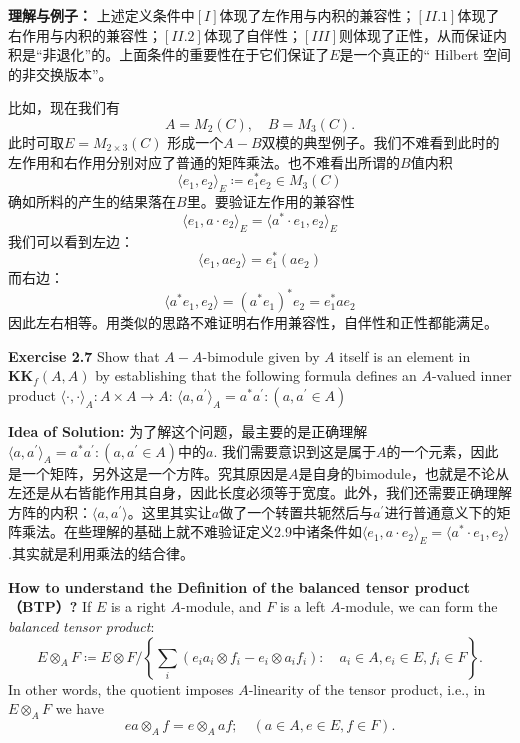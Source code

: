\textbf{理解与例子：} 上述定义条件中$[I]$体现了左作用与内积的兼容性；$[II.1]$体现了右作用与内积的兼容性；$[II.2]$体现了自伴性；$[III]$则体现了正性，从而保证内积是“非退化”的。上面条件的重要性在于它们保证了$E$是一个真正的“ Hilbert 空间的非交换版本”。

比如，现在我们有\[A=M_2(C),\quad B=M_3(C).\] 此时可取$E=M_{2\times 3}(C)$ 形成一个$A-B$双模的典型例子。我们不难看到此时的左作用和右作用分别对应了普通的矩阵乘法。也不难看出所谓的$B$值内积\[\langle e_1,e_2\rangle_E\coloneqq e_1^*e_2\in M_3(C)\]确如所料的产生的结果落在$B$里。要验证左作用的兼容性\[\langle e_1,a\cdot e_2\rangle_E=\langle a^*\cdot e_1, e_2\rangle_E\]我们可以看到左边：\[\langle e_1,ae_2\rangle=e_1^*(ae_2)\]而右边：\[\langle a^*e_1,e_2\rangle=(a^*e_1)^*e_2=e^*_1ae_2\]因此左右相等。用类似的思路不难证明右作用兼容性，自伴性和正性都能满足。

\textbf{Exercise 2.7} Show that $A - A$-bimodule given by $A$ itself is an element in $\textbf{KK}_f(A,A)$ by establishing that the following formula defines an $A$-valued inner product $\langle\cdot,\cdot\rangle_A:A\times A\rightarrow A$: $\langle a, a^{\prime}\rangle_A=a^*a^{\prime}: (a,a^{\prime}\in A)$

\textbf{Idea of Solution:} 为了解这个问题，最主要的是正确理解$\langle a, a^{\prime}\rangle_A=a^*a^{\prime}: (a,a^{\prime}\in A)$中的$a$. 我们需要意识到这是属于$A$的一个元素，因此是一个矩阵，另外这是一个方阵。究其原因是$A$是自身的bimodule，也就是不论从左还是从右皆能作用其自身，因此长度必须等于宽度。此外，我们还需要正确理解方阵的内积：$\langle a, a^{\prime}\rangle$。这里其实让$a$做了一个转置共轭然后与$a^{\prime}$进行普通意义下的矩阵乘法。在些理解的基础上就不难验证定义2.9中诸条件如$\langle e_1, a\cdot e_2\rangle_E=\langle a^*\cdot e_1, e_2\rangle$.其实就是利用乘法的结合律。


\textbf{How to understand the Definition of the balanced tensor product （BTP）?} If $E$ is a right $A$-module, and $F$ is a left $A$-module, we can form the \textit{balanced tensor product}: 
\begin{equation}
    E\otimes_A F\coloneqq E\otimes F/ \left\{\sum_i(e_ia_i\otimes f_i-e_i\otimes a_if_i):\quad a_i\in A, e_i\in E, f_i\in F\right\}.
\end{equation}
In other words, the quotient imposes $A$-linearity of the tensor product, i.e., in $E\otimes_AF$ we have 
\[ea\otimes_Af=e\otimes_Aaf; \quad (a\in A, e\in E, f\in F).\]

